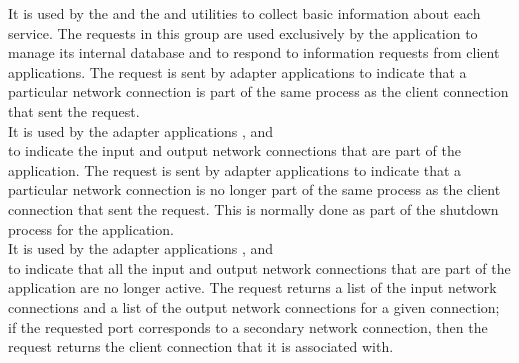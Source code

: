 It is used by the  and the
 and 
utilities to collect basic information about each service.
\secondaryEnd{}
The requests in this group are used exclusively by the
 application to manage its internal
database and to respond to information requests from client applications.
The  request is sent by
adapter applications to indicate that a particular \yarp{} network connection is part of
the same process as the client connection that sent the request.\\

It is used by the adapter applications ,
 and\\
 to indicate the input and output
\yarp{} network connections that are part of the application.
The  request is sent by
adapter applications to indicate that a particular \yarp{} network connection is no
longer part of the same process as the client connection that sent the request.
This is normally done as part of the shutdown process for the application.\\

It is used by the adapter applications ,
 and\\
 to indicate that all the input and
output \yarp{} network connections that are part of the application are no longer active.
The  request returns
a list of the input \yarp{} network connections and a list of the output \yarp{} network
connections for a given connection; if the requested port corresponds to a secondary
\yarp{} network connection, then the request returns the client connection that it is
associated with.\\

